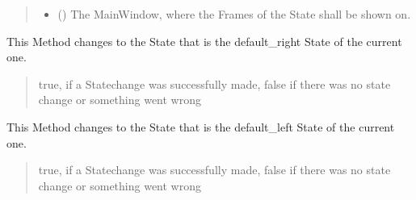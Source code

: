 \documentclass[letterpaper,10pt,english]{sphinxmanual}
\begin{document}
\begin{fulllineitems}
\begin{fulllineitems}
\begin{quote}
\begin{description}
\begin{itemize}
\item {} 
\sphinxAtStartPar
{} ({\hyperref[\detokenize{apidoc/src.osm_configurator.view.states:src.osm_configurator.view.states.main_window.MainWindow}]{}}) \textendash{} The MainWindow, where the Frames of the State shall be shown on.

\end{itemize}

\end{description}\end{quote}

\end{fulllineitems}


\begin{fulllineitems}
\label{\detokenize{apidoc/src.osm_configurator.view.states:src.osm_configurator.view.states.state_manager.StateManager.default_go_right}}
\pysigstartsignatures
{}
\pysigstopsignatures
\sphinxAtStartPar
This Method changes to the State that is the default\_right State of the current one.
\begin{quote}\begin{description}
\sphinxAtStartPar
true, if a Statechange was successfully made, false if there was no state change or something
went wrong

\sphinxAtStartPar
{}

\end{description}\end{quote}

\end{fulllineitems}


\begin{fulllineitems}
\label{\detokenize{apidoc/src.osm_configurator.view.states:src.osm_configurator.view.states.state_manager.StateManager.default_go_left}}
\pysigstartsignatures
{}
\pysigstopsignatures
\sphinxAtStartPar
This Method changes to the State that is the default\_left State of the current one.
\begin{quote}\begin{description}
\sphinxAtStartPar
true, if a Statechange was successfully made, false if there was no state change or something
went wrong


\end{description}
\end{quote}
\end{fulllineitems}
\end{fulllineitems}
\end{document}
